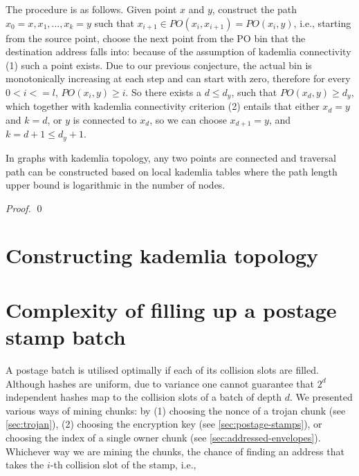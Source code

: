 The procedure is as follows. Given point $x$ and $y$, construct the path $x_0=x , x_1, ..., x_k=y$ such that $x_{i+1}\in \mathit{PO}(x_i, x_{i+1})=\mathit{PO}(x_i, y)$, i.e., starting from the source point, choose the next point from the PO bin that the destination address falls into: because of the assumption of kademlia connectivity (1) such a point exists. Due to our previous conjecture, the actual bin is monotonically increasing at each step and can start with zero, therefore for every $0<i<=l$, $\mathit{PO}(x_{i}, y)\geq i$. So there exists a $d\leq d_y$, such that 
$\mathit{PO}(x_{d}, y)\geq d_y$, which together with kademlia connectivity criterion (2) entails that either $x_d=y$ and $k=d$, or $y$ is connected to $x_d$, so we can choose $x_{d+1}=y$, and $k=d+1\leq d_y+1$.

\begin{theorem}{In graphs with kademlia topology, any two points are connected and traversal path can be constructed based on local kademlia tables where the path length upper bound is logarithmic in the number of nodes.}

\begin{proof}



\qed
\end{proof}
\end{theorem}

\section{Constructing kademlia topology}

\section{Complexity of filling up a postage stamp batch}\label{sec:complexity-filling}

A postage batch is utilised optimally if each of its collision slots are filled. Although hashes are uniform, due to variance one cannot guarantee that $2^d$ independent hashes map to the collision slots of a batch of depth $d$.
We presented various ways of mining chunks: by (1) choosing the nonce of a trojan chunk (see \ref{sec:trojan}), (2) choosing the encryption key (see \ref{sec:postage-stamps}), or choosing the index of a single owner chunk (see \ref{sec:addressed-envelopes}). Whichever way we are mining the chunks, the chance of finding an address that takes the $i$-th collision slot of the stamp, i.e., 


